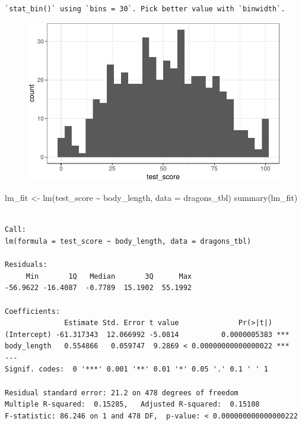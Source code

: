 \documentclass[
  letterpaper,
  DIV=11,
  oneside]{scrreport}
\newenvironment{Shaded}{\begin{snugshade}}{\end{snugshade}}
\newcommand{\AttributeTok}[1]{\textcolor[rgb]{0.40,0.45,0.13}{#1}}
\newcommand{\FunctionTok}[1]{\textcolor[rgb]{0.28,0.35,0.67}{#1}}
\newcommand{\NormalTok}[1]{\textcolor[rgb]{0.00,0.23,0.31}{#1}}
\newcommand{\OtherTok}[1]{\textcolor[rgb]{0.00,0.23,0.31}{#1}}
\newcommand{\SpecialCharTok}[1]{\textcolor[rgb]{0.37,0.37,0.37}{#1}}
\begin{document}
\begin{verbatim}
`stat_bin()` using `bins = 30`. Pick better value with `binwidth`.
\end{verbatim}

\begin{figure}[H]

{\centering \includegraphics{./stat-modeling-mixed_files/figure-pdf/unnamed-chunk-4-1.pdf}

}

\end{figure}

\begin{Shaded}
\begin{Highlighting}[]
\NormalTok{lm\_fit }\OtherTok{\textless{}{-}} \FunctionTok{lm}\NormalTok{(test\_score }\SpecialCharTok{\textasciitilde{}}\NormalTok{ body\_length, }\AttributeTok{data =}\NormalTok{ dragons\_tbl)}
\FunctionTok{summary}\NormalTok{(lm\_fit)}
\end{Highlighting}
\end{Shaded}

\begin{verbatim}

Call:
lm(formula = test_score ~ body_length, data = dragons_tbl)

Residuals:
     Min       1Q   Median       3Q      Max 
-56.9622 -16.4087  -0.7789  15.1902  55.1992 

Coefficients:
              Estimate Std. Error t value              Pr(>|t|)    
(Intercept) -61.317343  12.066992 -5.0814          0.0000005383 ***
body_length   0.554866   0.059747  9.2869 < 0.00000000000000022 ***
---
Signif. codes:  0 '***' 0.001 '**' 0.01 '*' 0.05 '.' 0.1 ' ' 1

Residual standard error: 21.2 on 478 degrees of freedom
Multiple R-squared:  0.15285,   Adjusted R-squared:  0.15108 
F-statistic: 86.246 on 1 and 478 DF,  p-value: < 0.000000000000000222
\end{verbatim}
\end{document}
